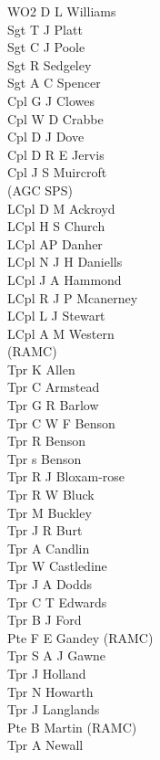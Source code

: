 \begin{multicols}{3}
  \scriptsize
  \noindent
  WO2 D L Williams \\
  Sgt T J Platt \\
  Sgt C J Poole \\
  Sgt R Sedgeley \\
  Sgt A C Spencer \\
  Cpl G J Clowes \\
  Cpl W D Crabbe \\
  Cpl D J Dove \\
  Cpl D R E Jervis \\
  Cpl J S Muircroft \\ \indent  (AGC SPS) \\
  LCpl D M Ackroyd \\
  LCpl H S Church \\
  LCpl AP Danher \\
  LCpl N J H Daniells \\
  LCpl J A Hammond \\
  LCpl R J P Mcanerney \\
  LCpl L J Stewart \\
  LCpl A M Western \\ \indent  (RAMC) \\
  Tpr K Allen \\
  Tpr C Armstead \\
  Tpr G R Barlow \\
  Tpr C W F Benson \\
  Tpr R Benson \\
  Tpr s Benson \\
  Tpr R J Bloxam-rose \\
  Tpr R W Bluck \\
  Tpr M Buckley \\
  Tpr J R Burt \\
  Tpr A Candlin \\
  Tpr W Castledine \\
  Tpr J A Dodds \\
  Tpr C T Edwards \\
  Tpr B J Ford \\
  Pte F E Gandey (RAMC) \\
  Tpr S A J Gawne \\
  Tpr J Holland \\
  Tpr N Howarth \\
  Tpr J Langlands \\
  Pte B Martin (RAMC) \\
  Tpr A Newall \\

\end{multicols}

